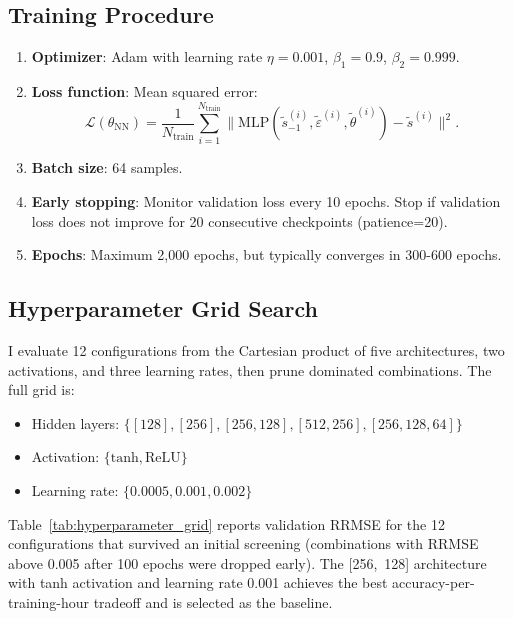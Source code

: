 \documentclass[12pt]{article}
\theoremstyle{plain}
\theoremstyle{definition}
\theoremstyle{remark}
\newcommand{\eps}{\varepsilon}
\begin{document}
\subsection{Training Procedure}

\begin{enumerate}
\item \textbf{Optimizer}: Adam with learning rate $\eta = 0.001$, $\beta_1=0.9$, $\beta_2=0.999$.

\item \textbf{Loss function}: Mean squared error:
\begin{equation}
\mathcal{L}(\theta_{\text{NN}}) = \frac{1}{N_{\text{train}}} \sum_{i=1}^{N_{\text{train}}} \|\text{MLP}(\tilde{s}_{-1}^{(i)}, \tilde{\eps}^{(i)}, \tilde{\theta}^{(i)}) - \tilde{s}^{(i)}\|^2.
\end{equation}

\item \textbf{Batch size}: 64 samples.

\item \textbf{Early stopping}: Monitor validation loss every 10 epochs. Stop if validation loss does not improve for 20 consecutive checkpoints (patience=20).

\item \textbf{Epochs}: Maximum 2,000 epochs, but typically converges in 300-600 epochs.
\end{enumerate}


\subsection{Hyperparameter Grid Search}

I evaluate 12 configurations from the Cartesian product of five architectures, two activations, and three learning rates, then prune dominated combinations. The full grid is:
\begin{itemize}
\item Hidden layers: $\{[128], [256], [256, 128], [512, 256], [256, 128, 64]\}$
\item Activation: $\{\text{tanh}, \text{ReLU}\}$
\item Learning rate: $\{0.0005, 0.001, 0.002\}$
\end{itemize}

Table~\ref{tab:hyperparameter_grid} reports validation RRMSE for the 12 configurations that survived an initial screening (combinations with RRMSE above 0.005 after 100 epochs were dropped early). The [256,~128] architecture with tanh activation and learning rate 0.001 achieves the best accuracy-per-training-hour tradeoff and is selected as the baseline.
\end{document}
